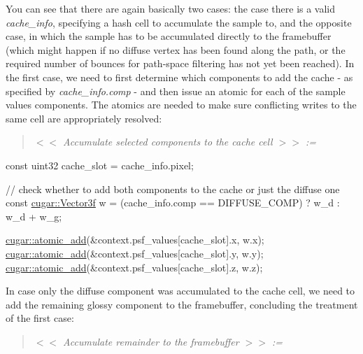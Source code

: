 \begin{DoxyParagraph}{}
You can see that there are again basically two cases\+: the case there is a valid {\itshape cache\+\_\+info}, specifying a hash cell to accumulate the sample to, and the opposite case, in which the sample has to be accumulated directly to the framebuffer (which might happen if no diffuse vertex has been found along the path, or the required number of bounces for path-\/space filtering has not yet been reached). In the first case, we need to first determine which components to add the cache -\/ as specified by {\itshape cache\+\_\+info.\+comp} -\/ and then issue an atomic for each of the sample value\textquotesingle{}s components. The atomics are needed to make sure conflicting writes to the same cell are appropriately resolved\+:
\end{DoxyParagraph}
\label{_p_s_f_p_t_page_Accumulate_selected_components_to_the_cache_cell_anchor}%
%
\begin{quote}
{\itshape  $<$$<$ Accumulate selected components to the cache cell $>$$>$ \+:= }

\end{quote}

\begin{DoxyCodeInclude}
                \textcolor{keyword}{const} uint32 cache\_slot = cache\_info.pixel;

                \textcolor{comment}{// check whether to add both components to the cache or just the diffuse one}
                \textcolor{keyword}{const} \hyperlink{structcugar_1_1_vector}{cugar::Vector3f} w = (cache\_info.comp == DIFFUSE\_COMP) ? w\_d : w\_d + 
      w\_g;

                \hyperlink{group___atomics_ga0c9d949be7ac5b6f27a232c7cd27a05c}{cugar::atomic\_add}(&context.psf\_values[cache\_slot].x, w.x);
                \hyperlink{group___atomics_ga0c9d949be7ac5b6f27a232c7cd27a05c}{cugar::atomic\_add}(&context.psf\_values[cache\_slot].y, w.y);
                \hyperlink{group___atomics_ga0c9d949be7ac5b6f27a232c7cd27a05c}{cugar::atomic\_add}(&context.psf\_values[cache\_slot].z, w.z);
\end{DoxyCodeInclude}
 \begin{DoxyParagraph}{}
In case only the diffuse component was accumulated to the cache cell, we need to add the remaining glossy component to the framebuffer, concluding the treatment of the first case\+:
\end{DoxyParagraph}
\label{_p_s_f_p_t_page_Accumulate_remainder_to_the_framebuffer_anchor}%
%
\begin{quote}
{\itshape  $<$$<$ Accumulate remainder to the framebuffer $>$$>$ \+:= }

\end{quote}

